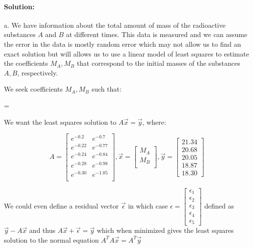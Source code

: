\documentclass[12pt, letterpaper]{article}
\theoremstyle{statement}
\theoremstyle{statement}
\newenvironment{Solution}{\noindent\ignorespaces\paragraph{Solution:}}{\hfill \ding{122}\par\noindent}
\begin{document}
    \begin{Solution}
    a. We have information about the total amount of mass of the radioactive substances $A$ and $B$ at different times. This data is measured and we can assume the error in the data is mostly random error which may not allow us to find an exact solution but will allows us to use a linear model of least squares to estimate the coefficients $M_A, M_B$ that correspond to the initial masses of the substances $A, B$, respectively.
    
    We seek coefficients $M_A, M_B$ such that:
    
    =
    
    We want the least squares solution to $A\vec{x}=\vec{y}$, where: 
    
    $$
    A=\begin{bmatrix} 
    e^{-0.2} & e^{-0.7}  \\
    e^{-0.22} & e^{-0.77}  \\
    e^{-0.24} & e^{-0.84}  \\
    e^{-0.28} & e^{-0.98}  \\
    e^{-0.30} & e^{-1.05} \\
    \end{bmatrix}
    ,
    \vec{x} = \begin{bmatrix} M_A \\ M_B \\ \end{bmatrix}
    ,
    \vec{y}= \begin{bmatrix} 21.34 \\ 20.68 \\ 20.05 \\ 18.87 \\ 18.30 \end{bmatrix}
    $$
    
    We could even define a residual vector $\vec{\epsilon}$ in which case $\epsilon=\begin{bmatrix} \epsilon_1 \\ \epsilon_2 \\ \epsilon_3 \\ \epsilon_4 \\ \epsilon_5\end{bmatrix}$ defined as $\vec{y}-A\vec{x}$ and thus $A\vec{x}+\vec{\epsilon}=\vec{y}$ which when minimized gives the least squares solution to the normal equation $A^{T}A\vec{x}=A^{T}\vec{y}$
    

\end{Solution}
\end{document}
